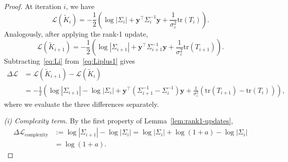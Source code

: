 \documentclass[10pt,a4paper]{amsart}
\newcommand{\tr}{\mathrm{tr}}
\begin{document}
\begin{proof}
    At iteration $i$, we have
    \begin{equation}
    \mathcal L(\widetilde K_i)
        =
        -\frac12\left(
        \log|\Sigma_i|
        +
        \bm y^\top\Sigma_i^{-1}\bm y
        +
        \frac{1}{\sigma_\varepsilon^2}\tr(T_i)
        \right).
    \label{eq:Li}
    \end{equation}
    Analogously, after applying the rank-1 update,
    \begin{equation}
        \mathcal L(\widetilde K_{i+1})
        =
        -\frac12\left(
        \log|\Sigma_{i+1}|
        +
        \bm y^\top\Sigma_{i+1}^{-1}\bm y
        +
        \frac{1}{\sigma_\varepsilon^2}\tr(T_{i+1})
        \right).
    \label{eq:Liplus1}
    \end{equation}
    Subtracting~\eqref{eq:Li} from~\eqref{eq:Liplus1} gives
    \begin{align}
        \Delta \mathcal L
        &=
        \mathcal L(\widetilde K_{i+1})-\mathcal L(\widetilde K_i) \nonumber \\
        &=
        -\frac12\left(
        \log|\Sigma_{i+1}|-\log|\Sigma_i|
        +
        \bm y^\top(\Sigma_{i+1}^{-1}-\Sigma_i^{-1})\bm y
        +
        \frac{1}{\sigma_\varepsilon^2}
        (\tr(T_{i+1})-\tr(T_i))
        \right),
    \label{eq:DeltaLDecomp}
    \end{align}
    where we evaluate the three differences separately.
    
    \noindent
    \emph{(i) Complexity term.}
    By the first property of Lemma~\ref{lem:rank1-updates},
    \begin{align*}
        \Delta\mathcal{L}_{\text{complexity}} &:= \log|\Sigma_{i+1}|-\log|\Sigma_i| =\log |\Sigma_i| + \log \left(1 + a \right) - \log| \Sigma_i|
        \\
        &=
        \log(1+a).
    \end{align*}
    

\end{proof}
\end{document}
